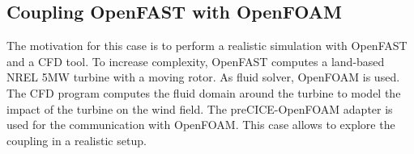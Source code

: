 \subsection{Coupling OpenFAST with OpenFOAM}

The motivation for this case is to perform a realistic simulation with OpenFAST and a CFD tool. To increase complexity, OpenFAST computes a land-based NREL 5MW turbine with a moving rotor. As fluid solver, OpenFOAM is used. The CFD program computes the fluid domain around the turbine to model the impact of the turbine on the wind field. The preCICE-OpenFOAM adapter is used for the communication with OpenFOAM. This case allows to explore the coupling in a realistic setup.

